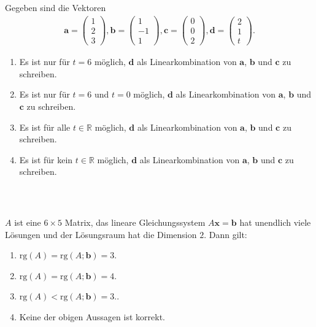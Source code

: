 \subsection*{}
Gegeben sind die Vektoren
\begin{align*}
\textbf{a}
= 
\begin{pmatrix}
1 \\ 2 \\ 3
\end{pmatrix},
\textbf{b}
=
\begin{pmatrix}
1 \\ -1 \\ 1
\end{pmatrix},
\textbf{c}
=
\begin{pmatrix}
0 \\ 0 \\ 2
\end{pmatrix},
\textbf{d}
=
\begin{pmatrix}
2 \\ 1 \\ t
\end{pmatrix}.
\end{align*}
\renewcommand{\labelenumi}{(\alph{enumi})}
\begin{enumerate}
\item 
Es ist nur für $ t = 6 $ möglich, $ \textbf{d} $ als Linearkombination von $ \textbf{a} $, $ \textbf{b} $ und $ \textbf{c} $ zu schreiben.
\item
Es ist nur für $ t = 6 $ und $ t = 0 $ möglich, $ \textbf{d} $ als Linearkombination von $ \textbf{a} $, $ \textbf{b} $ und $ \textbf{c} $ zu schreiben.
\item
Es ist für alle $ t\in \mathbb{R} $ möglich, $ \textbf{d} $ als Linearkombination von $ \textbf{a} $, $ \textbf{b} $ und $ \textbf{c} $ zu schreiben.
\item
Es ist für kein $ t\in \mathbb{R} $ möglich, $ \textbf{d} $ als Linearkombination von $ \textbf{a} $, $ \textbf{b} $ und $ \textbf{c} $ zu schreiben.
\end{enumerate}
\ \\
\subsection*{}
$ A $ ist eine $ 6 \times 5 $ Matrix, das lineare Gleichungssystem $ A \textbf{x} = \textbf{b} $ hat unendlich viele Lösungen und der Lösungsraum hat die Dimension $ 2 $.
Dann gilt:
\renewcommand{\labelenumi}{(\alph{enumi})}
\begin{enumerate}
\item 
$ \text{rg}(A) = \text{rg}(A; \textbf{b}) = 3 $.
\item
$ \text{rg}(A) = \text{rg}(A; \textbf{b}) = 4 $.
\item
$ \text{rg}(A) < \text{rg}(A; \textbf{b}) = 3 $..
\item
Keine der obigen Aussagen ist korrekt.
\end{enumerate}
\ \\
